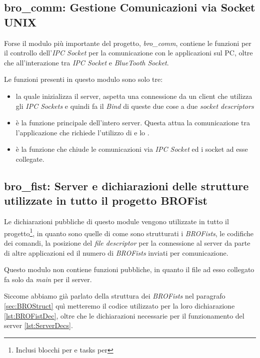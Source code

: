 \subsection[bro\_comm]{bro\_comm: Gestione Comunicazioni via Socket UNIX}
Forse il modulo più importante del progetto, \emph{bro\_comm}, contiene le
funzioni per il controllo dell'\emph{IPC Socket} per la comunicazione con
le applicazioni sul PC, oltre che all'interazione tra \emph{IPC Socket} e
\emph{BlueTooth Socket}.

Le funzioni presenti in questo modulo sono solo tre:
\begin{itemize}
    \item {} la quale
        inizializza il server, aspetta una connessione da un client che
        utilizza gli \emph{IPC Sockets} e quindi fa il \emph{Bind} di
        queste due cose a due \emph{socket descriptors}
    \item {} è la funzione principale dell'intero server. Questa
        attua la comunicazione tra l'applicazione che richiede l'utilizzo
        di \BROFist{} e lo \SPAM{}.
    \item {} è la funzione che chiude
        le comunicazioni via \emph{IPC Socket} ed i socket ad esse
        collegate.
\end{itemize}

\subsection[bro\_fist]{bro\_fist: Server e dichiarazioni delle strutture
utilizzate in tutto il progetto BROFist}
Le dichiarazioni pubbliche di questo module vengono utilizzate in tutto il
progetto\footnote{Inclusi blocchi per  e tasks per
\nxt{}}, in quanto sono quelle di come sono strutturati i \emph{BROFists},
le codifiche dei comandi, la posizione del \emph{file descriptor} per la
connessione al server da parte di altre applicazioni ed il numero di
\emph{BROFists} inviati per comunicazione.

Questo modulo non contiene funzioni pubbliche, in quanto il file
 ad esso collegato fa solo da \emph{main} per il server.

Siccome abbiamo già parlato della struttura dei \emph{BROFists} nel paragrafo
\ref{sec:BROStruct} quì metteremo il codice utilizzato per la loro
dichiarazione \ref{lst:BROFistDec}, oltre che le dichiarazioni necessarie
per il funzionamento del server \ref{lst:ServerDecs}.

